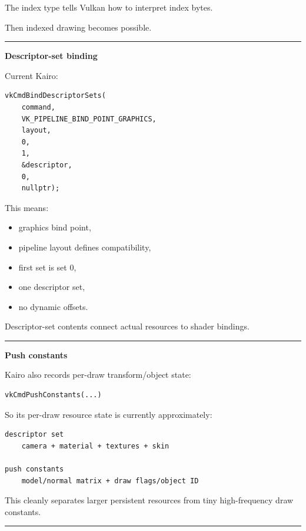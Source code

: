 The index type tells Vulkan how to interpret index bytes.

Then indexed drawing becomes possible.

\begin{center}\rule{0.5\linewidth}{0.5pt}\end{center}

\textbf{Descriptor-set binding}

Current Kairo:

\begin{verbatim}
vkCmdBindDescriptorSets(
    command,
    VK_PIPELINE_BIND_POINT_GRAPHICS,
    layout,
    0,
    1,
    &descriptor,
    0,
    nullptr);
\end{verbatim}

This means:

\begin{itemize}
\tightlist
\item
  graphics bind point,
\item
  pipeline layout defines compatibility,
\item
  first set is set 0,
\item
  one descriptor set,
\item
  no dynamic offsets.
\end{itemize}

Descriptor-set contents connect actual resources to shader bindings.

\begin{center}\rule{0.5\linewidth}{0.5pt}\end{center}

\textbf{Push constants}

Kairo also records per-draw transform/object state:

\begin{verbatim}
vkCmdPushConstants(...)
\end{verbatim}

So its per-draw resource state is currently approximately:

\begin{verbatim}
descriptor set
    camera + material + textures + skin

push constants
    model/normal matrix + draw flags/object ID
\end{verbatim}

This cleanly separates larger persistent resources from tiny high-frequency draw constants.

\begin{center}\rule{0.5\linewidth}{0.5pt}\end{center}


